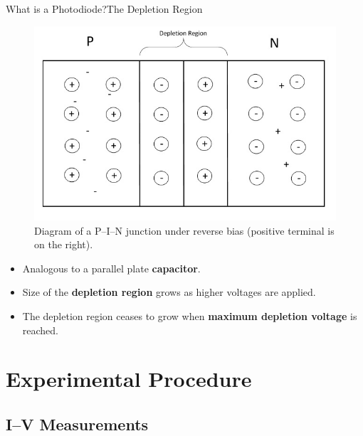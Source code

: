 \documentclass{beamer}
\begin{document}
    \begin{frame}{What is a Photodiode?}{The Depletion Region}
        \begin{minipage}{0.6\linewidth}
            \begin{figure}
                \centering
                \includegraphics[width = 0.9\linewidth]{PNJunctionDepletion.png}
                \caption{Diagram of a P--I--N junction under reverse bias (positive terminal is on the right).}
                \label{fig:Depletion}
            \end{figure}
        \end{minipage}%
        \begin{minipage}{0.4\linewidth}
            \begin{itemize}
                \item Analogous to a parallel plate \textbf{capacitor}.
                \vspace{0.5cm}
                \item Size of the \textbf{depletion region} grows as higher voltages are applied.
                \vspace{0.5cm}
                \item The depletion region ceases to grow when \textbf{maximum depletion voltage} is reached.
            \end{itemize}
        \end{minipage}
    \end{frame}

\section{Experimental Procedure}
\subsection{I--V Measurements}
    
\end{document}
